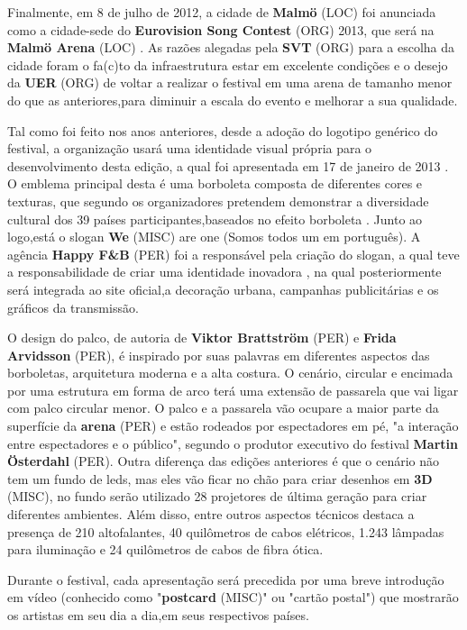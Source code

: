 \documentclass[12pt,a4paper]{article}
\begin{document}
Finalmente, em 8 de julho de 2012, a cidade de \textbf{Malmö} (LOC) foi anunciada como a cidade-sede do \textbf{Eurovision Song Contest} (ORG) 2013, que será na \textbf{Malmö Arena} (LOC) . As razões alegadas pela \textbf{SVT} (ORG) para a escolha da cidade foram o fa(c)to da infraestrutura estar em excelente condições e o desejo da \textbf{UER} (ORG) de voltar a realizar o festival em uma arena de tamanho menor do que as anteriores,para diminuir a escala do evento e melhorar a sua qualidade.

Tal como foi feito nos anos anteriores, desde a adoção do logotipo genérico do festival, a organização usará uma identidade visual própria para o desenvolvimento desta edição, a qual foi apresentada em 17 de janeiro de 2013 . O emblema principal desta é uma borboleta composta de diferentes cores e texturas, que segundo os organizadores pretendem demonstrar a diversidade cultural dos 39 países participantes,baseados no efeito borboleta . Junto ao logo,está o slogan \textbf{We} (MISC) are one (Somos todos um em português). A agência \textbf{Happy F\&B} (PER) foi a responsável pela criação do slogan, a qual teve a responsabilidade de criar uma identidade inovadora , na qual posteriormente será integrada ao site oficial,a decoração urbana, campanhas publicitárias e os gráficos da transmissão.

O design do palco, de autoria de \textbf{Viktor Brattström} (PER) e \textbf{Frida Arvidsson} (PER), é inspirado por suas palavras em diferentes aspectos das borboletas, arquitetura moderna e a alta costura. O cenário, circular e encimada por uma estrutura em forma de arco terá uma extensão de passarela que vai ligar com palco circular menor. O palco e a passarela vão ocupare a maior parte da superfície da \textbf{arena} (PER) e estão rodeados por espectadores em pé, "a interação entre espectadores e o público", segundo o produtor executivo do festival \textbf{Martin Österdahl} (PER). Outra diferença das edições anteriores é que o cenário não tem um fundo de leds, mas eles vão ficar no chão para criar desenhos em \textbf{3D} (MISC), no fundo serão utilizado 28 projetores de última geração para criar diferentes ambientes. Além disso, entre outros aspectos técnicos destaca a presença de 210 altofalantes, 40 quilômetros de cabos elétricos, 1.243 lâmpadas para iluminação e 24 quilômetros de cabos de fibra ótica.

Durante o festival, cada apresentação será precedida por uma breve introdução em vídeo (conhecido como "\textbf{postcard} (MISC)" ou "cartão postal") que mostrarão os artistas em seu dia a dia,em seus respectivos países.
\end{document}
